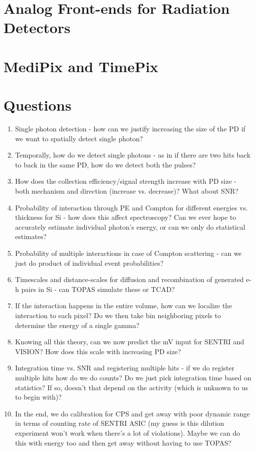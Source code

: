 \documentclass{article}
\begin{document}
\section{Analog Front-ends for Radiation Detectors}

\pagebreak
\newpage

\section{MediPix and TimePix}

\pagebreak
\newpage

\section{Questions }

\begin{enumerate}
    \item Single photon detection - how can we justify increasing the size of the PD if we want to spatially detect single photon?
    \item Temporally, how do we detect single photons - as in if there are two hits back to back in the same PD, how do we detect both the pulses?
    \item How does the collection efficiency/signal strength increase with PD size - both mechanism and direction (increase vs. decrease)? What about SNR?
    \item Probability of interaction through PE and Compton for different energies vs. thickness for Si - how does this affect spectroscopy? Can we ever hope to accurately 
    estimate individual photon's energy, or can we only do statistical estimates? 
    \item Probability of multiple interactions in case of Compton scattering - can we just do product of individual event probabilities?
    \item Timescales and distance-scales for diffusion and recombination of generated e-h pairs in Si - can TOPAS simulate these or TCAD?
    \item If the interaction happens in the entire volume, how can we localize the interaction to each pixel? Do we then take bin neighboring pixels 
    to determine the energy of a single gamma?
    \item Knowing all this theory, can we now predict the mV input for SENTRI and VISION? How does this scale with increasing PD size?
    \item Integration time vs. SNR and registering multiple hits - if we do register multiple hits how do we do counts? Do we just pick integration time based on statistics? If so,
    doesn't that depend on the activity (which is unknown to us to begin with)?
    \item In the end, we do calibration for CPS and get away with poor dynamic range in terms of counting rate of SENTRI ASIC (my guess is this dilution experiment won't work when there's a lot 
    of violations). Maybe we can do this with energy too and then get away without having to use TOPAS?
\end{enumerate}

\pagebreak
\newpage


\printbibliography
\end{document}
